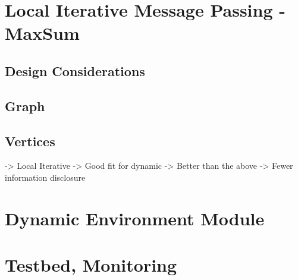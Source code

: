 \section{Local Iterative Message Passing - MaxSum}
\subsection{Design Considerations}
\subsection{Graph}
\subsection{Vertices}

-> Local Iterative
-> Good fit for dynamic
-> Better than the above
-> Fewer information disclosure

\section{Dynamic Environment Module}

%
%
%
%

\section{Testbed, Monitoring}
